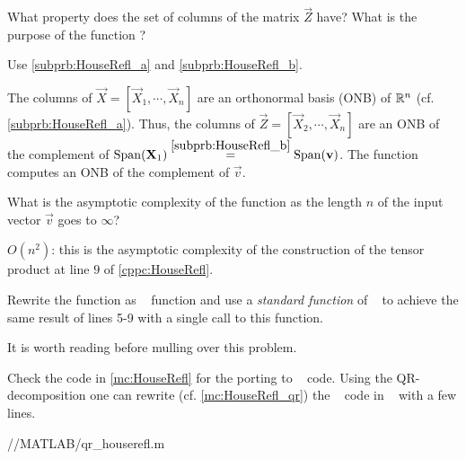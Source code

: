 \begin{problem}
\begin{subproblem}[2]
 What property does the set of columns of the matrix $\vec{Z}$ have? What is the purpose of the function ?
 
 \begin{hint}
  Use \ref{subprb:HouseRefl_a} and \ref{subprb:HouseRefl_b}.
 \end{hint}

 \begin{solution}
  The columns of $\vec{X} = [\vec{X}_1, \cdots, \vec{X}_n]$ are an orthonormal basis (ONB) of $\IR^n$ (cf. \ref{subprb:HouseRefl_a}). Thus, the columns of $\vec{Z} = [\vec{X}_2, \cdots, \vec{X}_n]$ are an ONB of the complement of $\mathrm{Span}(\vec{X}_1) \overset{\ref{subprb:HouseRefl_b}}{=} \mathrm{Span}(\vec{v})$. The function  computes an ONB of the complement of $\vec{v}$.
 \end{solution}
\end{subproblem}

\begin{subproblem}[1]
 What is the asymptotic complexity of the function   as the length $n$ of the input vector $\vec{v}$ goes to $\infty$?
 
 \begin{solution}
  $O(n^2)$: this is the asymptotic complexity of the construction of the tensor product at line $9$ of \autoref{cppc:HouseRefl}.
 \end{solution}

\end{subproblem}


\begin{subproblem}[3]
 Rewrite the function as \Matlab~ function and use a \emph{standard function} of
 \Matlab~ to achieve the same result of lines 5-9 with a single call to this
 function.

 \begin{hint}
   It is worth reading  before mulling over this problem. 
 \end{hint}
 
\begin{solution}
 Check the code in \autoref{mc:HouseRefl} for the porting to \Matlab~ code. Using the QR-decomposition  one can rewrite (cf. \autoref{mc:HouseRefl_qr}) the \Cpp~ code in \Matlab~ with a few lines.
 


{\problems/\chpt/MATLAB/qr_houserefl.m}
\end{solution}


\end{subproblem}

\end{problem}
